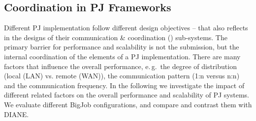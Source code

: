 \documentclass[conference]{IEEEtran}
\begin{document}







\subsection{Coordination in PJ Frameworks}
\label{sec:pj_performance}


Different PJ implementation follow different design objectives -- that
also reflects in the designs of their communication \& coordination
(\cc) sub-systems.  The primary barrier for performance and
scalability is not the \cu  submission, but the internal coordination
of the elements of a PJ implementation. There are many factors that
influence the overall performance, e.\,g.\ the degree of distribution
(local (LAN) vs. remote (WAN)), the communication pattern (1:n versus
n:n) and the communication frequency. In the following we investigate
the impact of different \cc related factors on the overall
performance and scalability of PJ systems.  We evaluate different
BigJob configurations, and compare and contrast them with DIANE.
\end{document}
